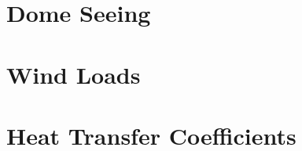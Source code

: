 \documentclass{gmto-book}
\begin{document}


\part{Dome Seeing}
\label{dome-seeing}





\part{Wind Loads}
\label{wind-loads}





\part{Heat Transfer Coefficients}
\label{htc}





\printbibliography
\end{document}
